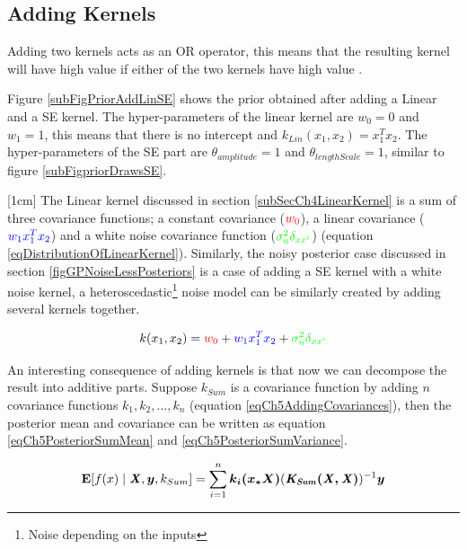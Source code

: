 \subsection{Adding Kernels} \label{subsecStructureKernelsAddingKernels}
Adding two kernels acts as an OR operator, this means that the resulting kernel will have high value if either of the two kernels have high value \cite{durrande2011additive}. 

Figure \ref{subFigPriorAddLinSE} shows the prior obtained after adding a Linear and a SE kernel. The hyper-parameters of the linear kernel are $w_{0}=0$ and $w_{1}=1$, this means that there is no intercept and $k_{Lin}(x_{1}, x_{2}) = x_{1}^Tx_{2}$. The hyper-parameters of the SE part are $\theta_{amplitude}=1$ and $\theta_{lengthScale}=1$, similar to figure \ref{subFigpriorDrawsSE}. 

[1cm]
The Linear kernel discussed in section \ref{subSecCh4LinearKernel} is a sum of three covariance functions; a constant covariance ($\textcolor{red}{w_{0}}$), a linear covariance ($\textcolor{blue}{w_{1}x_{1}^T x_{2}}$) and a white noise covariance function ($\textcolor{green}{\sigma_{n}^2\delta_{xx'}}$) (equation \ref{eqDistributionOfLinearKernel}). Similarly, the noisy posterior case discussed in section \ref{figGPNoiseLessPosteriors} is a case of adding a SE kernel with a white noise kernel, a heteroscedastic\footnote{Noise depending on the inputs} noise model can be similarly created by adding several kernels together.

\begin{equation}\label{eqDistributionOfLinearKernel}
k(x_{1}, x_{2}) = \textcolor{red}{w_{0}} + \textcolor{blue}{w_{1} x_{1}^T x_{2}} + \textcolor{green}{\sigma_{n}^2\delta_{xx'}}
\end{equation}

An interesting consequence of adding kernels is that now we can decompose the result into additive parts. Suppose $k_{Sum}$ is a covariance function by adding $n$ covariance functions $k_{1}, k_{2}, \ldots, k_{n}$ (equation \ref{eqCh5AddingCovariances}), then the posterior mean and covariance can be written as equation \ref{eqCh5PosteriorSumMean} and \ref{eqCh5PosteriorSumVariance}. 

\begin{align}\label{eqCh5PosteriorSumMean}
\mathbf{E}[f(x) \mid \bm{\mathit{X}}, \boldsymbol{y}, k_{Sum}] = \sum_{i=1}^{n} \boldsymbol{k_{i}(x_{*}X)}( \bm{\mathit{K_{Sum}(X, X)}})^{-1} \boldsymbol{y}
\end{align}

